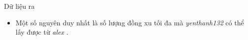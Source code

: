 Dữ liệu ra
\begin{itemize}
	\item     Một số nguyên duy nhất là số lượng đồng xu tối đa mà    \emph{     yenthanh132    }    có thể lấy được từ    \emph{     alex    }    .   
\end{itemize}